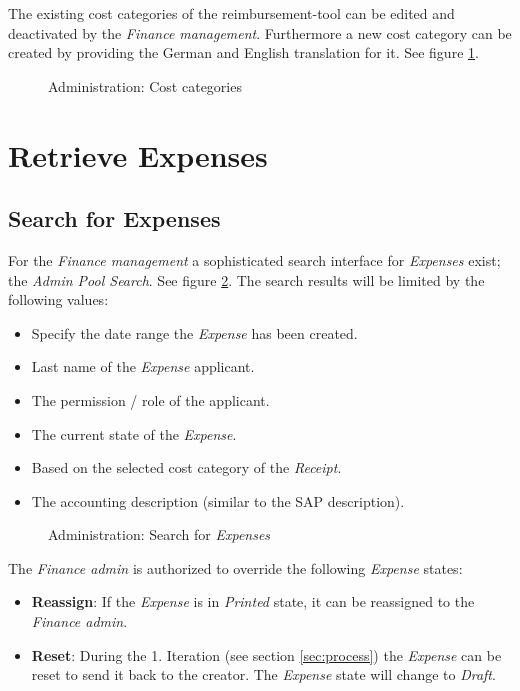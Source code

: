 The existing cost categories of the reimbursement-tool can be edited and deactivated by the \textit{Finance management}. Furthermore a new cost category can be created by providing the German and English translation for it. See figure \ref{fig:admin-costcategories}.

\begin{figure}[H]
    \centering
    \caption{Administration: Cost categories}
    \label{fig:admin-costcategories}
\end{figure}

\section{Retrieve Expenses}
\subsection{Search for Expenses}

For the \textit{Finance management} a sophisticated search interface for \textit{Expenses} exist; the \textit{Admin Pool Search}. See figure \ref{fig:admin-search}. The search results will be limited by the following values:

\begin{itemize}
    \item Specify the date range the \textit{Expense} has been created.
    \item Last name of the \textit{Expense} applicant.
    \item The permission / role of the applicant.
    \item The current state of the \textit{Expense}.
    \item Based on the selected cost category of the \textit{Receipt}.
    \item The accounting description (similar to the SAP description).
\end{itemize}

\begin{figure}[H]
    \centering
    \caption{Administration: Search for \textit{Expenses}}
    \label{fig:admin-search}
\end{figure}

The \textit{Finance admin} is authorized to override the following \textit{Expense} states:
\begin{itemize}
\item \textbf{Reassign}: If the \textit{Expense} is in \textit{Printed} state, it can be reassigned to the \textit{Finance admin}.
\item \textbf{Reset}: During the 1. Iteration (see section \ref{sec:process}) the \textit{Expense} can be reset to send it back to the creator. The \textit{Expense} state will change to \textit{Draft}. 
\end{itemize}

